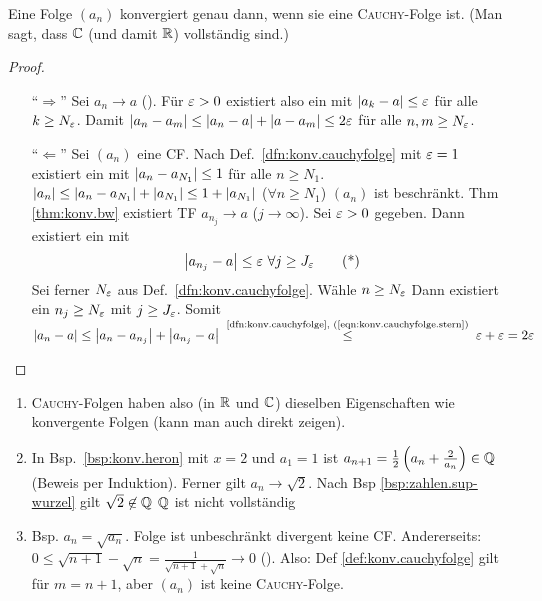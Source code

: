 \documentclass[12pt]{scrreprt}
\begin{document}
\begin{thm}
  \label{thm:konv.cauchyfolge}
  Eine Folge $(a_n)$ konvergiert genau dann, wenn sie eine
  \textsc{Cauchy}-Folge ist. (Man sagt, dass $\mathbb{C}$ (und damit $\mathbb{R}$)
  vollständig sind.)
\end{thm}
\begin{proof}
  \begin{enumerate}
  \item["`$\Rightarrow$"'] Sei $a_n\to a$ (\ninf). Für $\varepsilon>0$
    existiert also ein  mit $\left\lvert a_k-a\right\lvert\le\varepsilon$ für alle
    $k\ge N_\varepsilon$. Damit $\left\lvert a_n-a_m\right\lvert \le \left\lvert a_n-a\right\lvert+\left\lvert a-a_m\right\lvert \le
    2\varepsilon$ für alle $n, m \ge N_\varepsilon$.
  \item["`$\Leftarrow$"'] Sei $(a_n)$ eine CF. Nach
    Def.~\ref{dfn:konv.cauchyfolge} mit $\varepsilon=1$ existiert ein
     mit $\left\lvert a_n-a_{N_1}\right\lvert\le1$ für alle $n\ge N_1$. \folgt
    $\left\lvert a_n\right\lvert \le \left\lvert a_n-a_{N_1}\right\lvert+\left\lvert a_{N_1}\right\lvert \le
    1+\left\lvert a_{N_1}\right\lvert$ ($\forall n\ge N_1$) \folgt $(a_n)$ ist
    beschränkt. Thm \ref{thm:konv.bw} \folgt existiert TF $a_{n_j}\to
    a$ ($j\to\infty$). Sei $\varepsilon>0$ gegeben. Dann existiert ein
     mit
    \begin{equation} \label{eqn:konv.cauchyfolge.stern}
      \left\lvert a_{n_j}-a\right\lvert \le \varepsilon \ \forall j \ge J_\varepsilon \tag{*}
    \end{equation}
    Sei ferner $N_\varepsilon$ aus Def.~\ref{dfn:konv.cauchyfolge}. Wähle
    $n\ge N_\varepsilon$ Dann existiert ein $n_j\ge N_\varepsilon$ mit $j\ge
    J_\varepsilon$. Somit $\abs{a_n-a} \le \abs{a_n-a_{n_j}}+\abs{a_{n_j}-a}
    \nach{\le}{\ref{dfn:konv.cauchyfolge}, (\ref{eqn:konv.cauchyfolge.stern})} \ep+\ep = 2\ep$
  \end{enumerate}
\end{proof}

\begin{bem*}
  \begin{enumerate}
  \item \textsc{Cauchy}-Folgen haben also (in $\mathbb{R}$ und $\mathbb{C}$) dieselben
    Eigenschaften wie konvergente Folgen (kann man auch direkt zeigen).
  \item In Bsp.~\ref{bsp:konv.heron} mit $x=2$ und $a_1=1$ ist
    $a_{n+1}=\frac12\left(a_n+\frac{2}{a_n}\right) \in \mathbb{Q}$
    (Beweis per Induktion). Ferner gilt $a_n\to\sqrt{2}$. Nach Bsp
    \ref{bsp:zahlen.sup-wurzel} gilt $\sqrt{2}\not\in\mathbb{Q}$ \folgt
    $\mathbb{Q}$ ist nicht vollständig
  \item Bsp. $a_n=\sqrt{a_n}$. Folge ist unbeschränkt \folgt divergent
    \folgt keine CF. Andererseits: $0 \le \sqrt{n+1} - \sqrt{n} =
    \frac{1}{\sqrt{n+1}+\sqrt{n}} \to 0$ (\ninf). Also: Def
    \ref{def:konv.cauchyfolge} gilt für $m=n+1$, aber $(a_n)$ ist
    keine \textsc{Cauchy}-Folge.
  \end{enumerate}
\end{bem*}
\end{document}
